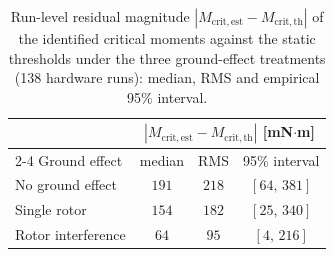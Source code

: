 \begin{table}[t]
\caption{Run-level residual magnitude
$|M_{\mathrm{crit,est}} - M_{\mathrm{crit,th}}|$ of the
identified critical moments against the static thresholds
under the three ground-effect treatments (138
hardware runs): median, RMS and empirical 95\% interval.}
\label{tab:mcrit_residual_summary}
\centering\small
\begin{tabular}{@{}lccc@{}}
\toprule
 & \multicolumn{3}{c}{$|M_{\mathrm{crit,est}} - M_{\mathrm{crit,th}}|$ [mN$\cdot$m]}\\
\cmidrule(l){2-4}
Ground effect & median & RMS & 95\% interval\\
\midrule
No ground effect & $191$ & $218$ & $[64,\,381]$\\
Single rotor & $154$ & $182$ & $[25,\,340]$\\
Rotor interference & $64$ & $95$ & $[4,\,216]$\\
\bottomrule
\end{tabular}
\end{table}
